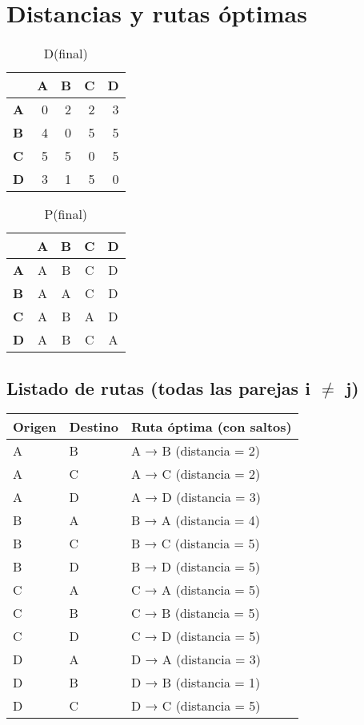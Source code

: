 \documentclass{article}
\begin{document}
\section*{Distancias y rutas óptimas}
\begin{table}[H]\centering
\caption{D(final)}
\begin{tabular}{l r r r r}
\toprule
 & \textbf{A} & \textbf{B} & \textbf{C} & \textbf{D}\\\midrule
\textbf{A} & 0 & 2 & 2 & 3 \\
\textbf{B} & 4 & 0 & 5 & 5 \\
\textbf{C} & 5 & 5 & 0 & 5 \\
\textbf{D} & 3 & 1 & 5 & 0 \\
\bottomrule
\end{tabular}
\end{table}

\begin{table}[H]\centering
\caption{P(final)}
\begin{tabular}{l c c c c}
\toprule
 & \textbf{A} & \textbf{B} & \textbf{C} & \textbf{D}\\\midrule
\textbf{A} & A & B & C & D \\
\textbf{B} & A & A & C & D \\
\textbf{C} & A & B & A & D \\
\textbf{D} & A & B & C & A \\
\bottomrule
\end{tabular}
\end{table}

\subsection*{Listado de rutas (todas las parejas i $\neq$ j)}
\begin{longtable}{llp{}}
\toprule
\textbf{Origen} & \textbf{Destino} & \textbf{Ruta óptima (con saltos)}\\\midrule
A & B & A → B (distancia = 2)\\
A & C & A → C (distancia = 2)\\
A & D & A → D (distancia = 3)\\
B & A & B → A (distancia = 4)\\
B & C & B → C (distancia = 5)\\
B & D & B → D (distancia = 5)\\
C & A & C → A (distancia = 5)\\
C & B & C → B (distancia = 5)\\
C & D & C → D (distancia = 5)\\
D & A & D → A (distancia = 3)\\
D & B & D → B (distancia = 1)\\
D & C & D → C (distancia = 5)\\
\bottomrule
\end{longtable}
\end{document}

